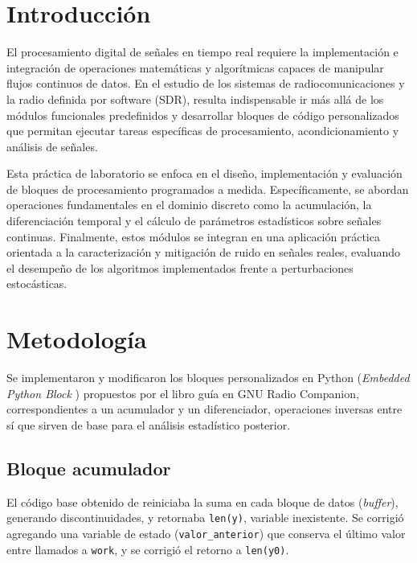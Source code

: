 \documentclass[twocolumn]{IEEEtran}
\begin{document}
\section{Introducción}

El procesamiento digital de señales en tiempo real requiere la implementación e integración de operaciones matemáticas y algorítmicas capaces de manipular flujos continuos de datos. En el estudio de los sistemas de radiocomunicaciones y la radio definida por software (SDR), resulta indispensable ir más allá de los módulos funcionales predefinidos y desarrollar bloques de código personalizados que permitan ejecutar tareas específicas de procesamiento, acondicionamiento y análisis de señales.

Esta práctica de laboratorio se enfoca en el diseño, implementación y evaluación de bloques de procesamiento programados a medida. Específicamente, se abordan operaciones fundamentales en el dominio discreto como la acumulación, la diferenciación temporal y el cálculo de parámetros estadísticos sobre señales continuas. Finalmente, estos módulos se integran en una aplicación práctica orientada a la caracterización y mitigación de ruido en señales reales, evaluando el desempeño de los algoritmos implementados frente a perturbaciones estocásticas.








\section{Metodología}

Se implementaron y modificaron los bloques personalizados en Python (\textit{Embedded Python Block} \cite{wikipediaPythonBlocks}) propuestos por el libro guía\cite{ortega2019comunicaciones} 
en GNU Radio Companion, correspondientes a un acumulador y un diferenciador, 
operaciones inversas entre sí que sirven de base para el análisis estadístico 
posterior.

\subsection{Bloque acumulador}
El código base obtenido de \cite{ortega2019comunicaciones} reiniciaba la suma en cada bloque de datos (\textit{buffer}), 
generando discontinuidades, y retornaba \texttt{len(y)}, variable inexistente. 
Se corrigió agregando una variable de estado (\texttt{valor\_anterior}) que 
conserva el último valor entre llamados a \texttt{work}, y se corrigió el retorno 
a \texttt{len(y0)}.
\end{document}

